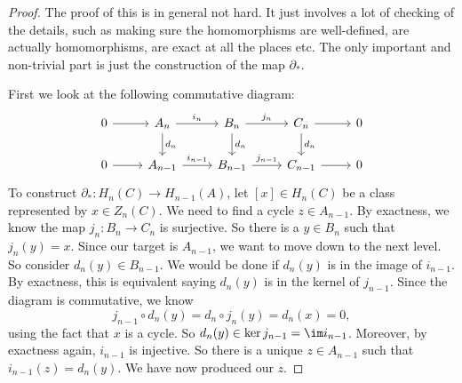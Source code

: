 \documentclass[a4paper]{article}
\begin{document}
\begin{proof}
  The proof of this is in general not hard. It just involves a lot of checking of the details, such as making sure the homomorphisms are well-defined, are actually homomorphisms, are exact at all the places etc. The only important and non-trivial part is just the construction of the map $\partial_*$.

  First we look at the following commutative diagram:
  \[
    \begin{tikzcd}
      0 \ar[r] & A_n \ar[r, "i_n"] \ar[d, "d_n"] & B_n \ar[r, "j_n"] \ar[d, "d_n"] & C_n \ar[r] \ar[d, "d_n"] & 0\\
      0 \ar[r] & A_{n - 1} \ar[r, "i_{n - 1}"] & B_{n - 1} \ar[r, "j_{n - 1}"] & C_{n - 1} \ar[r] & 0
    \end{tikzcd}
  \]
  To construct $\partial_*: H_n(C) \to H_{n - 1}(A)$, let $[x] \in H_n(C)$ be a class represented by $x \in Z_n(C)$. We need to find a cycle $z \in A_{n - 1}$. By exactness, we know the map $j_n: B_n \to C_n$ is surjective. So there is a $y \in B_n$ such that $j_n(y) = x$. Since our target is $A_{n - 1}$, we want to move down to the next level. So consider $d_n(y) \in B_{n - 1}$. We would be done if $d_n(y)$ is in the image of $i_{n - 1}$. By exactness, this is equivalent saying $d_n(y)$ is in the kernel of $j_{n -1 }$. Since the diagram is commutative, we know
  \[
    j_{n - 1}\circ d_n(y) = d_n \circ j_n (y) = d_n(x) = 0,
  \]
  using the fact that $x$ is a cycle. So $d_n (y) \in \ker j_{n - 1} = \im i_{n - 1}$. Moreover, by exactness again, $i_{n - 1}$ is injective. So there is a unique $z \in A_{n - 1}$ such that $i_{n - 1}(z) = d_n(y)$. We have now produced our $z$.


\end{proof}
\end{document}
